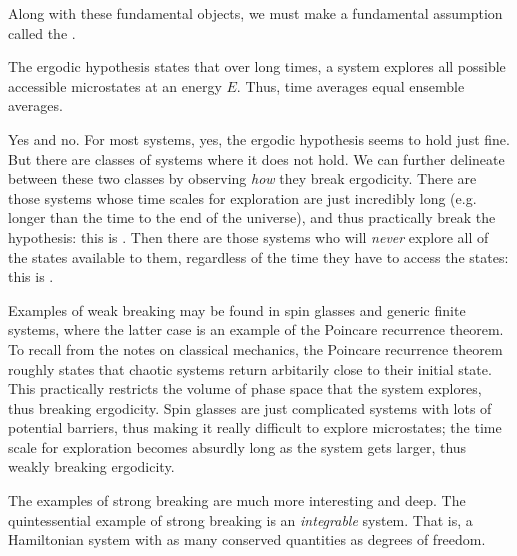 \documentclass[11pt]{article}
\begin{document}
Along with these fundamental objects, we must make a fundamental assumption
called the .

\begin{iidea}
    The ergodic hypothesis states that over long times, a system explores
    all possible accessible microstates at an energy $E$. Thus, time averages 
    equal ensemble averages. 
\end{iidea}

\begin{reemark}
    Yes and no. For most systems, yes, the ergodic hypothesis seems to 
    hold just fine. But there are classes of systems where it does not hold.
    We can further delineate between these two classes by observing \emph{how}
    they break ergodicity. There are those systems whose time scales for exploration
    are just incredibly long (e.g. longer than the time to the end of the universe),
    and thus practically break the hypothesis: this is .
    Then there are those systems who will \emph{never} explore all of the states
    available to them, regardless of the time they have to access the states:
    this is .

    Examples of weak breaking may be found in spin glasses and generic finite
    systems, where the latter case is an example of the Poincare recurrence theorem.
    To recall from the notes on classical mechanics, the Poincare recurrence theorem
    roughly states that chaotic systems return arbitarily close to their initial
    state. This practically restricts the volume of phase space that the system explores,
    thus breaking ergodicity. Spin glasses are just complicated systems with lots of
    potential barriers, thus making it really difficult to explore microstates; the time
    scale for exploration becomes absurdly long as the system gets larger, thus weakly
    breaking ergodicity.

    The examples of strong breaking are much more interesting and deep. The quintessential
    example of strong breaking is an \emph{integrable} system. That is, a Hamiltonian
    system with as many conserved quantities as degrees of freedom. 
\end{reemark}

\begin{eexample}
\end{eexample}
\end{document}
